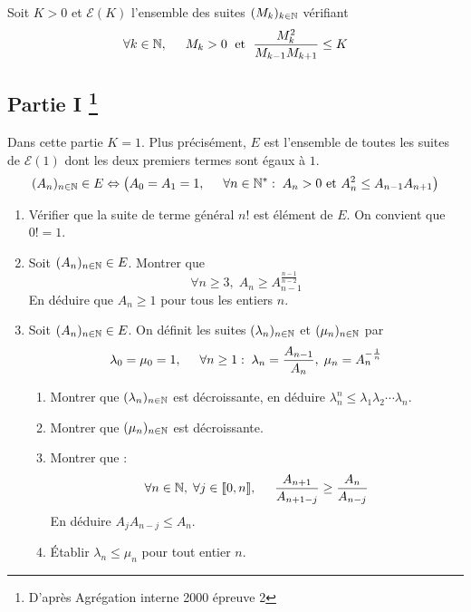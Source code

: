 Soit $K>0$ et $\mathcal{E}(K)$ l'ensemble des suites $(M_k)_{k\in\mathbb{N}}$ vérifiant
\begin{displaymath}
\forall k \in \mathbb{N}, \hspace{0.5cm}  M_k >0 \; \text{ et } \; \frac{M_k^2}{M_{k-1}M_{k+1}} \leq K
\end{displaymath}

\subsection*{Partie I \footnote{D'apr{\`e}s Agr{\'e}gation interne 2000 {\'e}preuve 2}}
Dans cette partie $K=1$. Plus pr{\'e}cis{\'e}ment, $E$ est l'ensemble de toutes les suites de $\mathcal{E}(1)$ dont les deux premiers termes sont égaux à $1$.
\begin{displaymath}
(A_n)_{n\in\mathbb{N}} \in E \Leftrightarrow \left( A_0=A_1=1,\hspace{0.5cm} \forall n \in \mathbb{N}^* :\; A_n >0 \text{ et } A_n^2\leq A_{n-1}A_{n+1}\right)   
\end{displaymath}

\begin{enumerate}
  \item V{\'e}rifier que la suite de terme g{\'e}n{\'e}ral $n!$ est {\'e}l{\'e}ment de $E$. On convient que $0! = 1$.
  
  \item Soit $(A_n)_{n\in\mathbb{N}} \in E$. Montrer que 
\begin{displaymath}
  \forall n \geq 3, \; A_n \geq A_{n-1}^\frac{n-1}{n-2}
\end{displaymath}
En déduire que $A_n \geq 1$ pour tous les entiers $n$.
  
  \item Soit $(A_n)_{n\in\mathbb{N}}\in E$. On d{\'e}finit  les suites $(\lambda_n)_{n\in\mathbb{N}}$ et $(\mu_n)_{n\in\mathbb{N}}$ par
\begin{displaymath}
\lambda_0=\mu_0=1, \hspace{0.5cm} \forall n\geq 1 : \;\lambda_n=\frac{A_{n-1}}{A_n} , \;\mu_n=A_n^{-\frac{1}{n}}  
\end{displaymath}
   \begin{enumerate}
     \item Montrer que $(\lambda_n)_{n\in\mathbb{N}}$ est d{\'e}croissante, en d{\'e}duire $\lambda_n^n \leq \lambda_1 \lambda_2 \cdots \lambda_n$.
     \item Montrer que $(\mu_n)_{n\in\mathbb{N}}$ est d{\'e}croissante.
     \item Montrer que :
\begin{displaymath}
\forall n \in \mathbb{N},\; \forall j \in \llbracket 0, n\rrbracket,\hspace{0.5cm} \frac{A_{n+1}}{A_{n+1-j}} \geq \frac{A_{n}}{A_{n-j}}
\end{displaymath}
En d{\'e}duire $A_j A_{n-j}\leq A_n$.
     \item {\'E}tablir $\lambda_n \leq \mu_n$ pour tout entier $n$.
\end{enumerate}
\end{enumerate}


